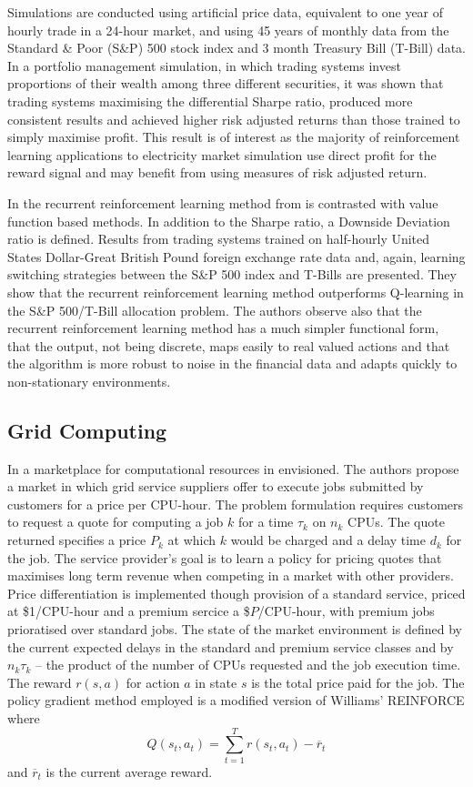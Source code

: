Simulations are conducted using artificial price data, equivalent to one year
of hourly trade in a 24-hour market, and using 45 years of monthly data from
the Standard \& Poor (S\&P) 500 stock index and 3 month Treasury Bill (T-Bill)
data. In a portfolio management simulation, in which trading systems invest
proportions of their wealth among three different securities, it was shown
that trading systems maximising the differential Sharpe ratio, produced more
consistent results and achieved higher risk adjusted returns than those
trained to simply maximise profit.  This result is of interest as the majority
of reinforcement learning applications to electricity market simulation use
direct profit for the reward signal and may benefit from using measures of risk
adjusted return.

In \cite{moody:direct} the recurrent reinforcement learning method from
\cite{moody:98} is contrasted with value function based methods.  In addition
to the Sharpe ratio, a Downside Deviation ratio is defined.  Results from trading
systems trained on half-hourly United States Dollar-Great British Pound foreign
exchange rate data and, again, learning switching strategies between the S\&P
500 index and T-Bills are presented.  They show that the recurrent
reinforcement learning method outperforms Q-learning in the S\&P
500/T-Bill allocation problem.  The authors observe also that the recurrent
reinforcement learning method has a much simpler functional form, that the
output, not being discrete, maps easily to real valued actions and that the
algorithm is more robust to noise in the financial data and adapts quickly to
non-stationary environments.

\subsection{Grid Computing}
In \cite{vengerov:grid} a marketplace for computational resources in
envisioned.  The authors propose a market in which grid service suppliers offer
to execute jobs submitted by customers for a price per CPU-hour.  The problem
formulation requires customers to request a quote for computing a job $k$ for a
time $\tau_k$ on $n_k$ CPUs.  The quote returned specifies a price $P_k$ at
which $k$ would be charged and a delay time $d_k$ for the job.  The service
provider's goal is to learn a policy for pricing quotes that maximises long
term revenue when competing in a market with other providers.  Price
differentiation is implemented though provision of a standard service, priced
at \$1/CPU-hour and a premium sercice a \$$P$/CPU-hour, with premium jobs
prioratised over standard jobs.  The state of the market environment is
defined by the current expected delays in the standard and premium service
classes and by $n_k \tau_k$ -- the product of the number of CPUs requested and
the job execution time.  The reward $r(s,a)$ for action $a$ in state $s$ is the
total price paid for the job.  The policy gradient method employed is a
modified version of Williams' REINFORCE where
\begin{equation}
Q(s_t,a_t) = \sum_{t=1}^T r(s_t,a_t) - \overline{r}_t
\end{equation}
and $\overline{r}_t$ is the current average reward.

